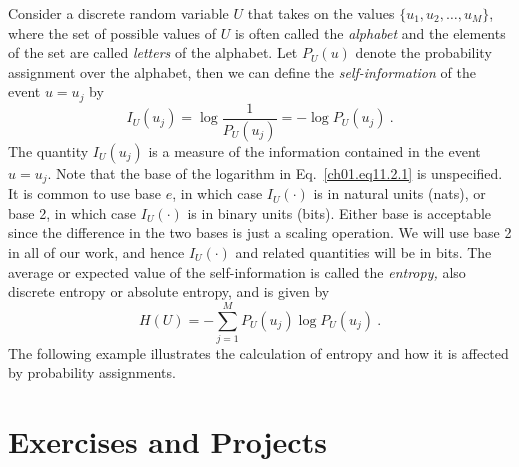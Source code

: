 Consider a discrete random variable $U$ that takes on
the values $\{u_1, u_2, \dots, u_M\}$, where the set of possible
values of $U$ is often called the \textit{alphabet} and the elements
of the set are called \textit{letters} of the alphabet. Let $P_U(u)$
denote the probability  assignment  over the alphabet, then we can
define the \textit{self-information} of the event $ u = u_j $ by
\begin{equation}
  I_U \left( u_j \right) = \log \frac{1}{P_U (u_j)} = - \log P_U
    \left( u_j \right)~.
\label{ch01.eq11.2.1}
\end{equation}
The quantity $I_U (u_j) $ is a measure  of the information  contained
in the event $ u = u_j$. Note that the base of the logarithm in
Eq.~\eqref{ch01.eq11.2.1} is unspecified. It is common
to use base $e$, in which case $I_U (\cdot) $ is in natural units (nats),
or base 2,  in which case $I_U(\cdot)$ is in binary units (bits).
Either base is acceptable since the difference in the two bases is just a
scaling operation. We will use base 2 in all of our work,
and hence $I_U(\cdot)$ and related quantities will be in bits.
The average or expected value of the self-information is called the
\textit{entropy,} also discrete entropy or absolute entropy, and is given by
\begin{equation}
 \displaystyle H(U) = - \sum^M_{j=1} P_U \left(u_j\right)
    \log P_U \left(u_j \right)~.
\label{ch01.eq11.2.2}
\end{equation}
The following example illustrates the calculation of entropy and how it is
affected by probability assignments.

\section{Exercises and Projects}
\label{cbir:exercises}

